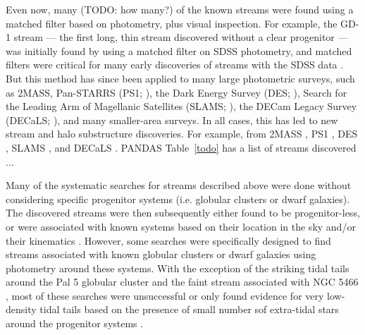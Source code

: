 \documentclass[final,5p,times,twocolumn,authoryear]{elsarticle}
\begin{document}
Even now, many (TODO: how many?) of the known streams were found using a matched filter
based on photometry, plus visual inspection.
For example, the GD-1 stream --- the first long, thin stream discovered without a clear
progenitor --- was initially found by \citet{Grillmair:2006:Detection63Cold} using a matched filter on
SDSS photometry, and matched filters were critical for many early discoveries of streams
with the SDSS data \citep[e.g.,][]{Newberg:2002:GhostSagittariusLumps,Yanny:2003:LowLatitudeHaloStream, Belokurov:2006:FieldStreamsSagittarius, Grillmair:2006:Detection45Tidal}.
But this method has since been applied to many large photometric surveys, such as 2MASS,
Pan-STARRS (PS1; \citealt{todo}), the Dark Energy Survey (DES; \citealt{todo}), Search
for the Leading Arm of Magellanic Satellites (SLAMS; \citealt{todo}), the DECam Legacy
Survey  (DECaLS; \citealt{todo}), and many smaller-area surveys.
In all cases, this has led to new stream and halo substructure discoveries.
For example, from 2MASS \citep{Rocha-Pinto, GASS, Anticenter stream}, PS1
\citep{Bernard, Ophiuchus, others?}, DES \citep{Shipp:2018}, SLAMS \citep{Jethwa:2018},
and DECaLS \citep{Shipp:2021}. PANDAS
Table~\ref{todo} has a list of streams discovered ...

Many of the systematic searches for streams described above were done without
considering specific progenitor systems (i.e. globular clusters or dwarf galaxies).
The discovered streams were then subsequently either found to be progenitor-less, or
were associated with known systems based on their location in the sky and/or their
kinematics \citep{todo}.
However, some searches were specifically designed to find streams associated with known
globular clusters or dwarf galaxies \citep{Grillmair:1990, todo} using photometry around
these systems.
With the exception of the striking tidal tails around the Pal 5 globular cluster and the
faint stream associated with NGC 5466 \citep{todo}, most of these searches were
unsuccessful or only found evidence for very low-density tidal tails based on the
presence of small number sof extra-tidal stars around the progenitor systems
\citep{todo}.
\end{document}
